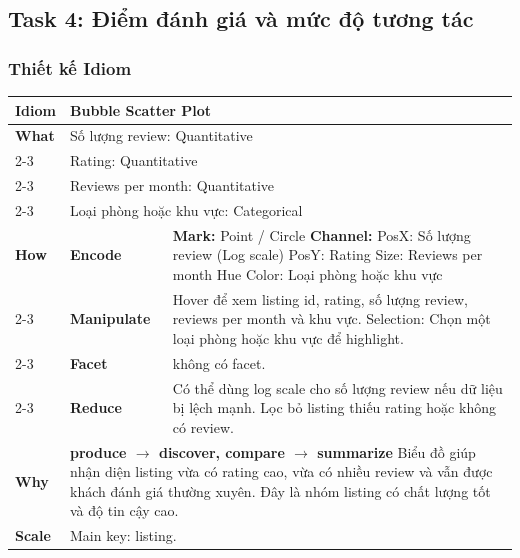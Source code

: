 \subsection{Task 4: Điểm đánh giá và mức độ tương tác}

\subsubsection{Thiết kế Idiom}

\begin{table}[H]
\centering
\renewcommand{\arraystretch}{1.1}
\begin{tabularx}{\textwidth}{|l|l|X|}
\hline
\textbf{Idiom} & \multicolumn{2}{l|}{\textbf{Bubble Scatter Plot}} \\ \hline
\textbf{What}
& \multicolumn{2}{X|}{Số lượng review: Quantitative} \\ \cline{2-3}
& \multicolumn{2}{X|}{Rating: Quantitative} \\ \cline{2-3}
& \multicolumn{2}{X|}{Reviews per month: Quantitative} \\ \cline{2-3}
& \multicolumn{2}{X|}{Loại phòng hoặc khu vực: Categorical} \\ \hline
\textbf{How}
& \textbf{Encode} &
\textbf{Mark:} Point / Circle \newline
\textbf{Channel:} \newline
\hspace*{1em} PosX: Số lượng review (Log scale) \newline
\hspace*{1em} PosY: Rating \newline
\hspace*{1em} Size: Reviews per month \newline
\hspace*{1em} Hue Color: Loại phòng hoặc khu vực \\ \cline{2-3}
& \textbf{Manipulate} &
Hover để xem listing id, rating, số lượng review, reviews per month và khu vực. \newline
Selection: Chọn một loại phòng hoặc khu vực để highlight. \\ \cline{2-3}
& \textbf{Facet} &
không có facet. \\ \cline{2-3}
& \textbf{Reduce} &
Có thể dùng log scale cho số lượng review nếu dữ liệu bị lệch mạnh. \newline
Lọc bỏ listing thiếu rating hoặc không có review. \\ \hline
\textbf{Why} & \multicolumn{2}{X|}{
\textbf{produce $\rightarrow$ discover, compare $\rightarrow$ summarize} \newline
Biểu đồ giúp nhận diện listing vừa có rating cao, vừa có nhiều review và vẫn được khách đánh giá thường xuyên. Đây là nhóm listing có chất lượng tốt và độ tin cậy cao.
} \\ \hline
\textbf{Scale} & \multicolumn{2}{X|}{
Main key: listing.
} \\ \hline
\end{tabularx}
\end{table}

